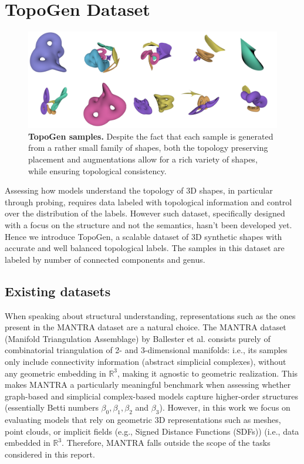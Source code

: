 \section{TopoGen Dataset}
\label{sec:topogen}

\begin{figure}[!t]
  \centering
  \includegraphics[width=1.0\linewidth]{figs/topogen/samples_overview.png}

  \label{fig:topogen-samples}
  \caption{\textbf{TopoGen samples.} Despite the fact that each sample is generated from a rather small family of shapes, both the topology preserving placement and augmentations allow for a rich variety of shapes, while ensuring topological consistency.}
  \label{fig:short}
\end{figure}

Assessing how models understand the topology of 3D shapes, in particular through probing, requires data labeled with topological information and control over the distribution of the labels. However such dataset, specifically designed with a focus on the structure and not the semantics, hasn't been developed yet. Hence we introduce TopoGen, a scalable dataset of 3D synthetic shapes with accurate and well balanced topological labels. The samples in this dataset are labeled by number of connected components and genus.

\subsection{Existing datasets}
\label{ssec:existing_datasets}

When speaking about structural understanding, representations such as the ones present in the MANTRA \cite{mantra} dataset are a natural choice. The MANTRA dataset (Manifold Triangulation Assemblage) by Ballester et al. consists purely of combinatorial triangulation of 2- and 3-dimensional manifolds: i.e., its samples only include connectivity information (abstract simplicial complexes), without any geometric embedding in $\mathbb{R}^3$, making it agnostic to geometric realization. This makes MANTRA a particularly meaningful benchmark when assessing whether graph-based and simplicial complex-based models capture higher-order structures (essentially Betti numbers $\beta_0, \beta_1, \beta_2$ and $\beta_3$). However, in this work we focus on evaluating models that rely on geometric 3D representations such as meshes, point clouds, or implicit fields (e.g., Signed Distance Functions (SDFs)) (i.e., data embedded in $\mathbb{R}^3$. Therefore, MANTRA falls outside the scope of the tasks considered in this report.


